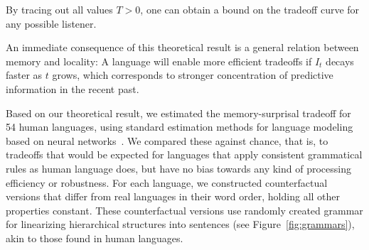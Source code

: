 \documentclass[11pt,letterpaper]{article}
\newcounter{theorem}
\begin{document}
By tracing out all values $T >0$, one can obtain a bound on the tradeoff curve for any possible listener.


An immediate consequence of this theoretical result is a general relation between memory and locality:
A language will enable more efficient tradeoffs if $I_t$ decays faster as $t$ grows, which corresponds to stronger concentration of predictive information in the recent past.








%
%




Based on our theoretical result, we estimated the memory-surprisal tradeoff for 54 human languages, using standard estimation methods for language modeling based on neural networks~\citep{hochreiter-long-1997}.
We compared these against chance, that is, to tradeoffs that would be expected for languages that apply consistent grammatical rules as human language does, but have no bias towards any kind of processing efficiency or robustness.
For each language, we constructed counterfactual versions that differ from real languages in their word order, holding all other properties constant.
These counterfactual versions use randomly created grammar for linearizing hierarchical structures into sentences (see Figure~\ref{fig:grammars}), akin to those found in human languages.


%
\end{document}
